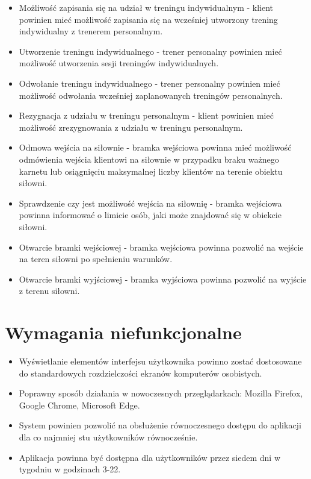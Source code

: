 \documentclass[a4paper,twoside,12pt]{book}
\begin{document}
\begin{itemize}
			\item Możliwość zapisania się na udział w treningu indywidualnym - klient powinien mieć możliwość zapisania się na wcześniej utworzony trening indywidualny z trenerem personalnym.
			\item Utworzenie treningu indywidualnego - trener personalny powinien mieć możliwość utworzenia sesji treningów indywidualnych.
			\item Odwołanie treningu indywidualnego - trener personalny powinien mieć możliwość odwołania wcześniej zaplanowanych treningów personalnych.
			\item Rezygnacja z udziału w treningu personalnym - klient powinien mieć możliwość zrezygnowania z udziału w treningu personalnym.
			\item Odmowa wejścia na siłownie - bramka wejściowa powinna mieć możliwość odmówienia wejścia klientowi na siłownie w przypadku braku ważnego karnetu lub osiągnięciu maksymalnej liczby klientów na terenie obiektu siłowni.
			\item Sprawdzenie czy jest możliwość wejścia na siłownię - bramka wejściowa powinna informować o limicie osób, jaki może znajdować się w obiekcie siłowni.
			\item Otwarcie bramki wejściowej - bramka wejściowa powinna pozwolić na wejście na teren siłowni po spełnieniu warunków.
			\item Otwarcie bramki wyjściowej - bramka wyjściowa powinna pozwolić na wyjście z terenu siłowni.
		\end{itemize}
			
	\section {Wymagania niefunkcjonalne}
		\begin {itemize}
			\item Wyświetlanie elementów interfejsu użytkownika powinno zostać dostosowane do standardowych rozdzielczości ekranów komputerów osobistych.
			\item Poprawny sposób działania w nowoczesnych przeglądarkach: Mozilla Firefox, Google Chrome, Microsoft Edge.
			\item System powinien pozwolić na obsłużenie równoczesnego dostępu do aplikacji dla co najmniej stu użytkowników równocześnie.
			\item Aplikacja powinna być dostępna dla użytkowników przez siedem dni w tygodniu w godzinach 3-22.
		\end{itemize}
	
\end{document}
